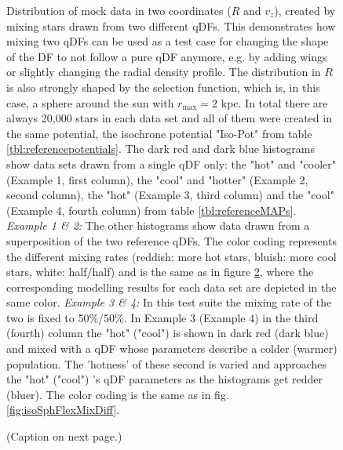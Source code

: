 \begin{figure}
\caption{Distribution of mock data in two coordinates ($R$ and $v_z$), created by mixing stars drawn from two different qDFs. This demonstrates how mixing two qDFs can be used as a test case for changing the shape of the DF to not follow a pure qDF anymore, e.g. by adding wings or slightly changing the radial density profile. The distribution in $R$ is also strongly shaped by the selection function, which is, in this case, a sphere around the sun with $r_\text{max}=2$ kpc. In total there are always 20,000 stars in each data set and all of them were created in the same potential, the isochrone potential "Iso-Pot" from table \ref{tbl:referencepotentials}. The dark red and dark blue histograms show data sets drawn from a single qDF only: the "hot" and "cooler" \MAPs (Example 1, first column), the "cool" and "hotter" \MAPs (Example 2, second column), the "hot" (Example 3, third column) and the "cool" \MAPs (Example 4, fourth column) from table \ref{tbl:referenceMAPs}. \emph{Example 1 \& 2:} The other histograms show data drawn from a superposition of the two reference qDFs. The color coding represents the different mixing rates (reddish: more hot stars, bluish: more cool stars, white: half/half) and is the same as in figure \ref{fig:isoSphFlexMixCont}, where the corresponding modelling results for each data set are depicted in the same color. \emph{Example 3 \& 4:} In this test suite the mixing rate of the two \MAPs is fixed to 50\%/50\%. In Example 3 (Example 4) in the third (fourth) column the "hot" ("cool") \MAP is shown in dark red (dark blue) and mixed with a qDF whose parameters describe a colder (warmer) population. The 'hotness' of these second \MAP is varied and approaches the "hot" ("cool") \MAP's qDF parameters as the histograms get redder (bluer). The color coding is the same as in fig. \ref{fig:isoSphFlexMixDiff}.}
\label{fig:isoSphFlexMixCont_mockdata}
\end{figure}


\begin{figure}
\caption{(Caption on next page.)}
\label{fig:isoSphFlexMixCont}
\end{figure}

